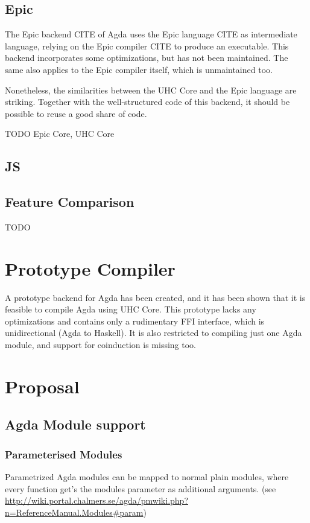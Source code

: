 \documentclass[12pt, a4paper, twoside]{report}
\begin{document}
\section{Epic}
The Epic backend CITE of Agda uses the Epic language CITE as intermediate language, relying on the Epic
compiler CITE to produce an executable. This backend incorporates some optimizations, but has not been
maintained. The same also applies to the Epic compiler itself, which is unmaintained too.

Nonetheless, the similarities between the UHC Core and the Epic language are striking. Together with
the well-structured code of this backend, it should be possible to reuse a good share of code.

TODO Epic Core, UHC Core

\section{JS}

\section{Feature Comparison}
TODO

\chapter{Prototype Compiler}
A prototype backend for Agda has been created, and it has been shown that it is feasible to compile
Agda using UHC Core. This prototype lacks any optimizations and contains only a rudimentary FFI
interface, which is unidirectional (Agda to Haskell). It is also restricted to compiling just one
Agda module, and support for coinduction is missing too.

\chapter{Proposal}
\section{Agda Module support}
\subsection{Parameterised Modules}
Parametrized Agda modules can be mapped to normal plain modules, where every function get's the
modules parameter as additional arguments. (see \url{http://wiki.portal.chalmers.se/agda/pmwiki.php?n=ReferenceManual.Modules#param})
\end{document}
